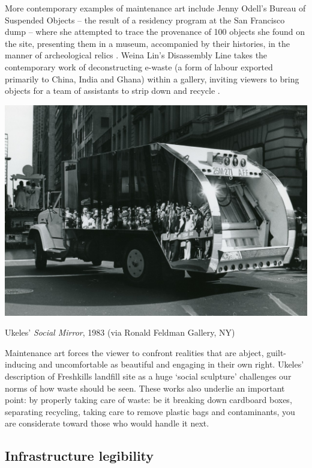 \documentclass[nofonts,nols,justified,nobib]{tufte-book}
\begin{document}
More contemporary examples of maintenance art include Jenny Odell's Bureau of Suspended Objects --  the result of a residency program at the San Francisco dump -- where she attempted to trace the provenance of 100 objects she found on the site, presenting them in a museum, accompanied by their histories, in the manner of archeological relics \cite{odell_archive_2015}. Weina Lin's Disassembly Line takes the contemporary work of deconstructing e-waste (a form of labour exported primarily to China, India and Ghana) within a gallery, inviting viewers to bring objects for a team of assistants to strip down and recycle \cite{lin_disassembly_2016}.

\begin{marginfigure}
\includegraphics[width=\textwidth]{img/1/social-mirror.jpg}
\caption{Ukeles' \emph{Social Mirror}, 1983 (via Ronald Feldman Gallery, NY) \label{b}}
\end{marginfigure}

Maintenance art forces the viewer to confront realities that are abject, guilt-inducing and uncomfortable as beautiful and engaging in their own right. Ukeles' description of  Freshkills landfill site as a huge `social sculpture' challenges our norms of how waste should be seen\cite{cotter_artist_2017}. These works also underlie an important point: by properly taking care of waste: be it breaking down cardboard boxes, separating recycling, taking care to remove plastic bags and contaminants, you are considerate toward those who would handle it next.


\subsection*{Infrastructure legibility}
\end{document}
